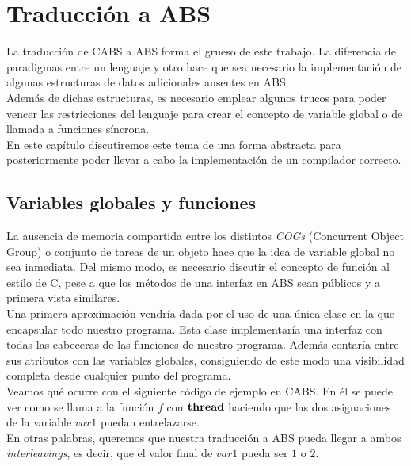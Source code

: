 \chapter{Traducción a ABS}
La traducción de CABS a ABS forma el grueso de este trabajo. La diferencia de paradigmas entre un lenguaje y otro hace que sea necesario la implementación de algunas estructuras de datos adicionales ausentes en ABS.\\

Además de dichas estructuras, es necesario emplear algunos trucos para poder vencer las restricciones del lenguaje para crear el concepto de variable global o de llamada a funciones síncrona.\\

En este capítulo discutiremos este tema de una forma abstracta para posteriormente poder llevar a cabo la implementación de un compilador correcto.

\section{Variables globales y funciones}
La ausencia de memoria compartida entre los distintos \emph{COGs} (Concurrent Object Group) o conjunto de tareas de un objeto hace que la idea de variable global no sea inmediata. Del mismo modo, es necesario discutir el concepto de función al estilo de C, pese a que los métodos de una interfaz en ABS sean públicos y a primera vista similares.\\

Una primera aproximación vendría dada por el uso de una única clase en la que encapsular todo nuestro programa. Esta clase implementaría una interfaz con todas las cabeceras de las funciones de nuestro programa. Además contaría entre sus atributos con las variables globales, consiguiendo de este modo una visibilidad completa desde cualquier punto del programa.\\

Veamos qué ocurre con el siguiente código de ejemplo en CABS. En él se puede ver como se llama a la función $f$ con $\textbf{thread}$ haciendo que las dos asignaciones de la variable $var1$ puedan entrelazarse.\\



En otras palabras, queremos que nuestra traducción a ABS pueda llegar a ambos \emph{interleavings}, es decir, que el valor final de $var1$ pueda ser $1$ o $2$.\\

